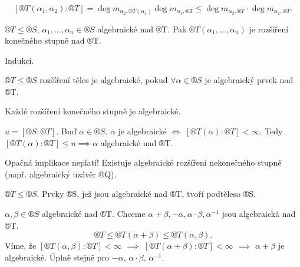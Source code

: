 \documentclass[12pt]{article}                   %
\begin{document}
        \begin{dusledek}
            $$ [®T(\alpha_1, \alpha_2):®T] = \deg m_{\alpha_2, ®T(\alpha_1)} \deg m_{\alpha_1, ®T} ≤ \deg m_{\alpha_2, ®T} · \deg m_{\alpha_1, ®T}. $$
        \end{dusledek}

        \begin{dusledek}
                $®T ≤ ®S$, $\alpha_1, …, \alpha_n \in ®S$ algebraické nad ®T. Pak $®T(\alpha_1, …, \alpha_n)$ je rozšíření konečného stupně nad ®T.

            \begin{dukazin}
                Indukcí.
            \end{dukazin}
        \end{dusledek}

        \begin{definice}
            $®T ≤ ®S$ rozšíření těles je algebraické, pokud $\forall \alpha \in ®S$ je algebraický prvek nad ®T.
        \end{definice}

        \begin{tvrzeni}
            Každé rozšíření konečného stupně je algebraické.

            \begin{dukazin}
                    $u = [®S:®T]$. Buď $\alpha \in ®S$. $\alpha$ je algebraické $\Leftrightarrow$ $[®T(\alpha):®T] < ∞$. Tedy $[®T(\alpha) : ®T] ≤ n \implies \alpha$ algebraické nad ®T.
            \end{dukazin}
        \end{tvrzeni}

        \begin{poznamka}
            Opačná implikace neplatí! Existuje algebraické rozšíření nekonečného stupně (např. algebraický uzávěr ®Q).
        \end{poznamka}

        \begin{veta}
            $®T ≤ ®S$. Prvky ®S, jež jsou algebraické nad ®T, tvoří podtěleso ®S.

            \begin{dukazin}
                $\alpha, \beta \in ®S$ algebraické nad ®T. Chceme $\alpha + \beta, -\alpha, \alpha·\beta, \alpha^{-1}$ jsou algebraická nad ®T.
                $$ ®T ≤ ®T(\alpha + \beta) ≤ ®T(\alpha, \beta). $$
                Víme, že $[®T(\alpha, \beta) : ®T] < ∞$ $\implies$ $[®T(\alpha + \beta) : ®T] < ∞$ $\implies$ $\alpha + \beta$ je algebraické. Úplně stejně pro $-\alpha$, $\alpha·\beta$, $\alpha^{-1}$.
            \end{dukazin}
        \end{veta}
\end{document}
